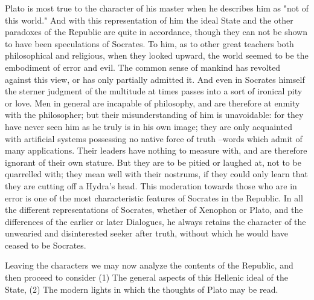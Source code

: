 Plato is most true to the character of his master when he describes him as "not of this world." And with this representation of him the ideal State and the other paradoxes of the Republic are quite in accordance, though they can not be shown to have been speculations of Socrates. To him, as to other great teachers both philosophical and religious, when they looked upward, the world seemed to be the embodiment of error and evil. The common sense of mankind has revolted against this view, or has only partially admitted it. And even in Socrates himself the sterner judgment of the multitude at times passes into a sort of ironical pity or love. Men in general are incapable of philosophy, and are therefore at enmity with the philosopher; but their misunderstanding of him is unavoidable: for they have never seen him as he truly is in his own image; they are only acquainted with artificial systems possessing no native force of truth --words which admit of many applications. Their leaders have nothing to measure with, and are therefore ignorant of their own stature. But they are to be pitied or laughed at, not to be quarrelled with; they mean well with their nostrums, if they could only learn that they are cutting off a Hydra's head. This moderation towards those who are in error is one of the most characteristic features of Socrates in the Republic. In all the different representations of Socrates, whether of Xenophon or Plato, and the differences of the earlier or later Dialogues, he always retains the character of the unwearied and disinterested seeker after truth, without which he would have ceased to be Socrates.

Leaving the characters we may now analyze the contents of the Republic, and then proceed to consider (1) The general aspects of this Hellenic ideal of the State, (2) The modern lights in which the thoughts of Plato may be read.
